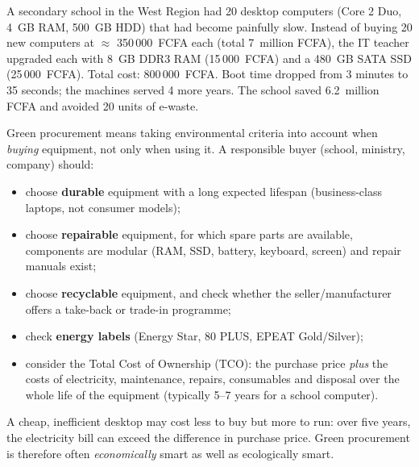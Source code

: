\documentclass[11pt]{article}
\newcommand{\cle}[1]{{\popxbold\color{popdark}#1}}
\newcounter{popsec}
\newcounter{popsub}
\newcommand{\courssub}[1]{%
  \stepcounter{popsub}%
  \par\vspace{9pt}\noindent{\popxbold\fontsize{11.5}{13}\selectfont\color{popink}{\color{poporange}\thepopsec.\thepopsub}\hspace{6pt}#1}\par\nopagebreak\vspace{4pt}
}
\begin{document}
\begin{exemplebox}
A secondary school in the West Region had 20 desktop computers (Core 2 Duo, 4~GB RAM, 500~GB HDD) that had become painfully slow. Instead of buying 20 new computers at $\approx$ 350\,000~FCFA each (total 7~million FCFA), the IT teacher upgraded each with 8~GB DDR3 RAM (15\,000~FCFA) and a 480~GB SATA SSD (25\,000~FCFA). Total cost: 800\,000~FCFA. Boot time dropped from 3 minutes to 35 seconds; the machines served 4 more years. The school saved 6.2~million FCFA and avoided 20 units of e-waste.
\end{exemplebox}

\courssub{Green Procurement}

\cle{Green procurement} means taking environmental criteria into account when \emph{buying} equipment, not only when using it. A responsible buyer (school, ministry, company) should:

\begin{itemize}
\item choose \textbf{durable} equipment with a long expected lifespan (business-class laptops, not consumer models);
\item choose \textbf{repairable} equipment, for which spare parts are available, components are modular (RAM, SSD, battery, keyboard, screen) and repair manuals exist;
\item choose \textbf{recyclable} equipment, and check whether the seller/manufacturer offers a take-back or trade-in programme;
\item check \textbf{energy labels} (Energy Star, 80 PLUS, EPEAT Gold/Silver);
\item consider the \cle{Total Cost of Ownership (TCO)}: the purchase price \emph{plus} the costs of electricity, maintenance, repairs, consumables and disposal over the whole life of the equipment (typically 5--7 years for a school computer).
\end{itemize}

A cheap, inefficient desktop may cost less to buy but more to run: over five years, the electricity bill can exceed the difference in purchase price. Green procurement is therefore often \emph{economically} smart as well as ecologically smart.
\end{document}
